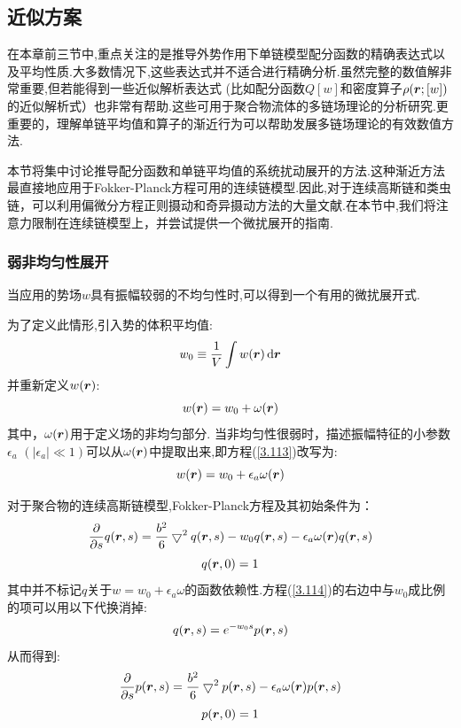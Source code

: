 \subsection{近似方案}
在本章前三节中,重点关注的是推导外势作用下单链模型配分函数的精确表达式以及平均性质.大多数情况下,这些表达式并不适合进行精确分析.虽然完整的数值解非常重要,但若能得到一些近似解析表达式
(比如配分函数$Q[w]$和密度算子$\rho(\bm{r} ;[w])$的近似解析式）也非常有帮助.这些可用于聚合物流体的多链场理论的分析研究.更重要的，理解单链平均值和算子的渐近行为可以帮助发展多链场理论的有效数值方法.

本节将集中讨论推导配分函数和单链平均值的系统扰动展开的方法.这种渐近方法最直接地应用于Fokker-Planck方程可用的连续链模型.因此,对于连续高斯链和类虫链，可以利用偏微分方程正则摄动和奇异摄动方法的大量文献.在本节中,我们将注意力限制在连续链模型上，并尝试提供一个微扰展开的指南.
\subsubsection{弱非均匀性展开}
当应用的势场$w$具有振幅较弱的不均匀性时,可以得到一个有用的微扰展开式.

为了定义此情形,引入势的体积平均值:
\begin{equation}
w_0\equiv \frac{1}{V} \int w(\bm{r} )\,\mathrm{d}\bm{r} 
\end{equation}
并重新定义$w(\bm{r} )$:
\begin{equation}
w(\bm{r} )=w_0+\omega(\bm{r} ) \label{3.113}
\end{equation}
其中，$\omega(\bm{r} )$用于定义场的非均匀部分.
当非均匀性很弱时，描述振幅特征的小参数$\epsilon_a$ $(|\epsilon_a| \ll 1)$可以从$\omega(\bm{r} )$中提取出来,即方程(\ref{3.113})改写为:
$$w(\bm{r} )=w_0+\epsilon_a \omega(\bm{r} )$$

对于聚合物的连续高斯链模型,Fokker-Planck方程及其初始条件为：
\begin{equation}
\frac{\partial}{\partial s} q(\bm{r} ,s) = \frac{b^2}{6} \bigtriangledown^2 q(\bm{r} ,s) -w_0 q(\bm{r} ,s) -\epsilon_a \omega(\bm{r} ) q(\bm{r} ,s) \label{3.114}
\end{equation}
\begin{equation}
q(\bm{r} ,0) = 1 \label{3.115}
\end{equation}
其中并不标记$q$关于$w = w_0+\epsilon_a \omega$的函数依赖性.方程(\ref{3.114})的右边中与$w_0$成比例的项可以用以下代换消掉:
\begin{equation}
q(\bm{r} ,s) = e^{-w_0 s} p(\bm{r} ,s) \label{3.116}
\end{equation}
从而得到:
\begin{equation}
\frac{\partial}{\partial s} p(\bm{r} ,s) = \frac{b^2}{6} \bigtriangledown^2 p(\bm{r} ,s) -\epsilon_a \omega(\bm{r} ) p(\bm{r} ,s) \label{3.117}
\end{equation}
\begin{equation}
p(\bm{r} ,0) = 1 \label{3.118}
\end{equation}

